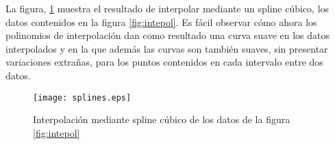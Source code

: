 




    




 La figura, \ref{fig:splines} muestra el resultado de interpolar mediante un spline cúbico, los datos contenidos en la figura \ref{fig:intepol}. Es fácil observar cómo ahora los polinomios de interpolación dan como resultado una curva suave en los datos interpolados y en la que además las curvas son también suaves, sin presentar variaciones extrañas, para los puntos contenidos en cada intervalo entre dos datos.
 
\begin{figure}[h]
\centering
\texttt{[image: splines.eps]}
\caption{Interpolación mediante spline cúbico de los datos de la figura \ref{fig:intepol}} 
\label{fig:splines}
\end{figure} 
 
